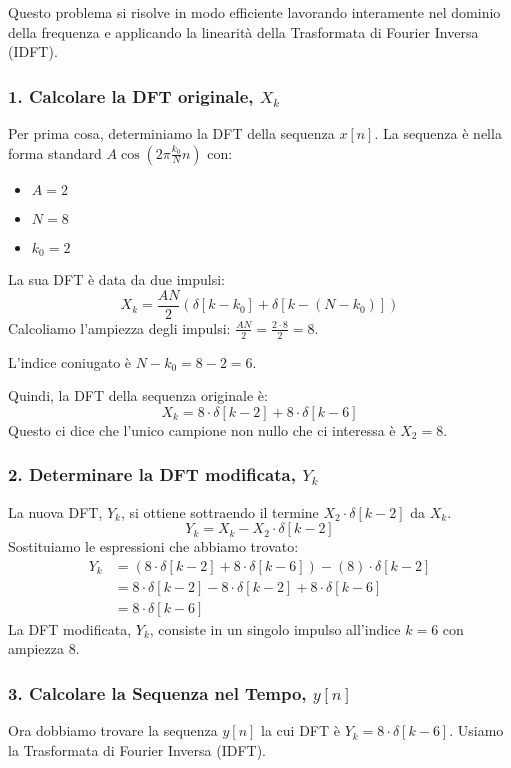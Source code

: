 
\begin{soluzione}{19}
    Questo problema si risolve in modo efficiente lavorando interamente nel dominio della frequenza e applicando la linearità della Trasformata di Fourier Inversa (IDFT).

    \subsubsection*{1. Calcolare la DFT originale, $X_k$}
    Per prima cosa, determiniamo la DFT della sequenza $x[n]$. La sequenza è nella forma standard $A\cos(2\pi \frac{k_0}{N}n)$ con:
    \begin{itemize}
        \item $A = 2$
        \item $N = 8$
        \item $k_0 = 2$
    \end{itemize}
    La sua DFT è data da due impulsi:
    \[
        X_k = \frac{AN}{2} \left( \delta[k-k_0] + \delta[k-(N-k_0)] \right)
    \]
    Calcoliamo l'ampiezza degli impulsi: $\frac{AN}{2} = \frac{2 \cdot 8}{2} = 8$.
    
    L'indice coniugato è $N-k_0 = 8-2 = 6$.
    
    Quindi, la DFT della sequenza originale è:
    \[
        X_k = 8 \cdot \delta[k-2] + 8 \cdot \delta[k-6]
    \]
    Questo ci dice che l'unico campione non nullo che ci interessa è $X_2 = 8$.

    \subsubsection*{2. Determinare la DFT modificata, $Y_k$}
    La nuova DFT, $Y_k$, si ottiene sottraendo il termine $X_2 \cdot \delta[k-2]$ da $X_k$.
    \[
        Y_k = X_k - X_2 \cdot \delta[k-2]
    \]
    Sostituiamo le espressioni che abbiamo trovato:
    \begin{align*}
        Y_k &= \left( 8 \cdot \delta[k-2] + 8 \cdot \delta[k-6] \right) - (8) \cdot \delta[k-2] \\
        &= 8 \cdot \delta[k-2] - 8 \cdot \delta[k-2] + 8 \cdot \delta[k-6] \\
        &= 8 \cdot \delta[k-6]
    \end{align*}
    La DFT modificata, $Y_k$, consiste in un singolo impulso all'indice $k=6$ con ampiezza 8.

    \subsubsection*{3. Calcolare la Sequenza nel Tempo, $y[n]$}
    Ora dobbiamo trovare la sequenza $y[n]$ la cui DFT è $Y_k = 8 \cdot \delta[k-6]$. Usiamo la Trasformata di Fourier Inversa (IDFT).
    

\end{soluzione}
